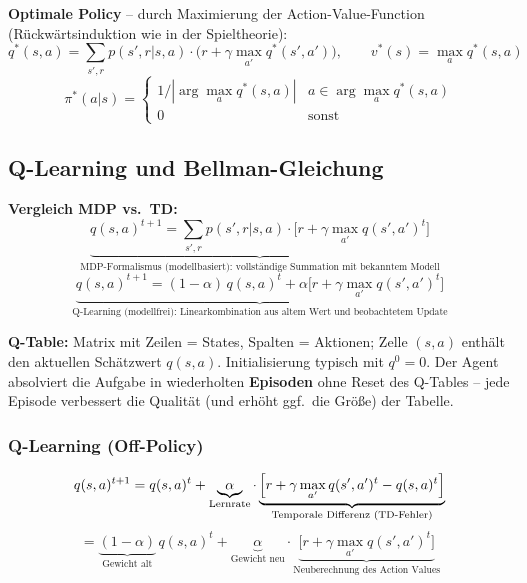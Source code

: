 \textbf{Optimale Policy} -- durch Maximierung der Action-Value-Function (Rückwärtsinduktion wie in der Spieltheorie):
\[
q^*(s,a) = \sum_{s',r} p(s',r|s,a)\cdot\bigl(r + \gamma\max_{a'} q^*(s',a')\bigr), \qquad v^*(s) = \max_a q^*(s,a)
\]
\[
\pi^*(a|s) = \begin{cases} 1/|\arg\max_a q^*(s,a)| & a \in \arg\max_a q^*(s,a) \\ 0 & \text{sonst} \end{cases}
\]

\newpage

\subsection{Q-Learning und Bellman-Gleichung}


\textbf{Vergleich MDP vs.\ TD:}
\[
\underbrace{q(s,a)^{t+1} = \sum_{s',r} p(s',r|s,a)\cdot\bigl[r + \gamma\max_{a'} q(s',a')^t\bigr]}_{\text{MDP-Formalismus (modellbasiert): vollständige Summation mit bekanntem Modell}}
\]
\[
\underbrace{q(s,a)^{t+1} = (1-\alpha)\,q(s,a)^t + \alpha\bigl[r + \gamma\max_{a'} q(s',a')^t\bigr]}_{\text{Q-Learning (modellfrei): Linearkombination aus altem Wert und beobachtetem Update}}
\]

\textbf{Q-Table:} Matrix mit Zeilen = States, Spalten = Aktionen; Zelle $(s,a)$ enthält den aktuellen Schätzwert $q(s,a)$. Initialisierung typisch mit $q^0 = 0$. Der Agent absolviert die Aufgabe in wiederholten \textbf{Episoden} ohne Reset des Q-Tables -- jede Episode verbessert die Qualität (und erhöht ggf.\ die Größe) der Tabelle.

\subsubsection*{Q-Learning (Off-Policy)}

\[
q(s,a)^{t+1} = q(s,a)^t + \underbrace{\alpha}_{\text{Lernrate}} \cdot \underbrace{\Bigl[r + \gamma\max_{a'} q(s',a')^t - q(s,a)^t\Bigr]}_{\text{Temporale Differenz (TD-Fehler)}}
\]
\[
= \underbrace{(1-\alpha)}_{\text{Gewicht alt}}\,q(s,a)^t + \underbrace{\alpha}_{\text{Gewicht neu}}\cdot\underbrace{\bigl[r + \gamma\max_{a'} q(s',a')^t\bigr]}_{\text{Neuberechnung des Action Values}}
\]

